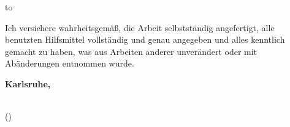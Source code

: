 \vspace*{32\baselineskip}
\hbox to \textwidth{\hrulefill}
\par
Ich versichere wahrheitsgemäß, die Arbeit selbstständig angefertigt, alle benutzten Hilfsmittel vollständig und genau angegeben und alles kenntlich gemacht zu haben, was aus Arbeiten anderer unverändert oder mit Abänderungen entnommen wurde.

\textbf{Karlsruhe, \submissiontime}
\vspace{1.5cm}

\dotfill\hspace*{8.0cm}\\
\hspace*{2cm}(\textbf{\myname}) %


\thispagestyle{empty}

\cleardoublepage